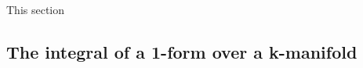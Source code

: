 \documentclass[.../main.tex]{subfiles}
\begin{document}
This section 

\subsection{The integral of a 1-form over a k-manifold}


\end{document}
